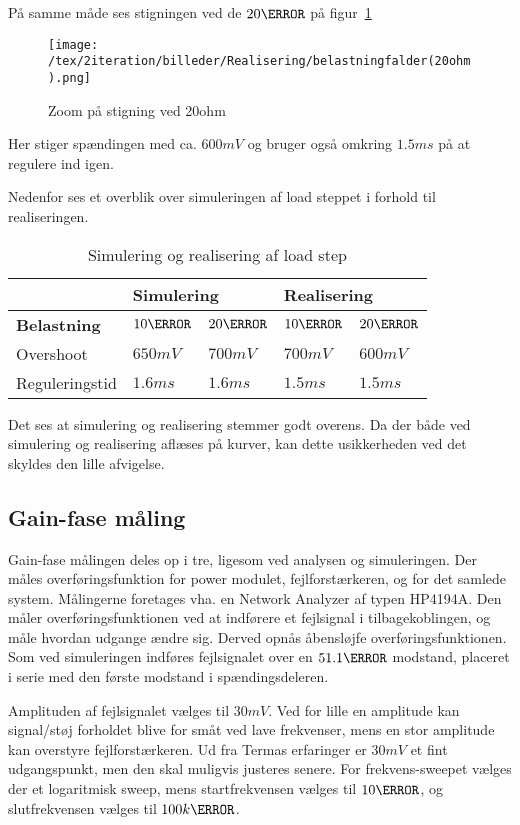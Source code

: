 På samme måde ses stigningen ved de $20\ohm$ på figur~\ref{fig:belastning_20ohm}
\begin{figure}[H]
	\center
	\texttt{[image: /tex/2iteration/billeder/Realisering/belastningfalder(20ohm).png]}
	\caption{Zoom på stigning ved 20ohm}
	\label{fig:belastning_20ohm}
\end{figure}
Her stiger spændingen med ca. $600mV$ og bruger også omkring $1.5ms$ på at regulere ind igen. 

Nedenfor ses et overblik over simuleringen af load steppet i forhold til realiseringen. 

\begin{table}[H] 			
	\centering
	\begin{tabularx}{\textwidth}{|X|l|l|l|l|}
		\hline
		& \multicolumn{2}{|l|}{\textbf{Simulering}} & \multicolumn{2}{|l|}{\textbf{Realisering}} \\ \hline
		\textbf{Belastning} & $10\ohm$ & $20\ohm$ & $10\ohm$ & $20\ohm$ \\ \hline
		Overshoot & $650mV$ & $700mV$ & $700mV$ & $600mV$  \\ \hline
		Reguleringstid & $1.6ms$ & $1.6ms$ & $1.5ms$ & $1.5ms$ \\ \hline
	\end{tabularx}
	\caption{Simulering og realisering af load step}
	\label{tab:Loadstep}
\end{table}
Det ses at simulering og realisering stemmer godt overens. Da der både ved simulering og realisering aflæses på kurver, kan dette usikkerheden ved det skyldes den lille afvigelse.

\subsection{Gain-fase måling}
Gain-fase målingen deles op i tre, ligesom ved analysen og simuleringen. Der måles overføringsfunktion for power modulet, fejlforstærkeren, og for det samlede system. Målingerne foretages vha. en Network Analyzer af typen HP4194A. Den måler overføringsfunktionen ved at indførere et fejlsignal i tilbagekoblingen, og måle hvordan udgange ændre sig. Derved opnås åbensløjfe overføringsfunktionen. Som ved simuleringen indføres fejlsignalet over en $51.1\ohm$ modstand, placeret i serie med den første modstand i spændingsdeleren. 

Amplituden af fejlsignalet vælges til $30mV$. Ved for lille en amplitude kan signal/støj forholdet blive for småt ved lave frekvenser, mens en stor amplitude kan overstyre fejlforstærkeren. Ud fra Termas erfaringer er $30mV$ et fint udgangspunkt, men den skal muligvis justeres senere. For frekvens-sweepet vælges der et logaritmisk sweep, mens startfrekvensen vælges til $10\hertz$, og slutfrekvensen vælges til $100k\hertz$. 

